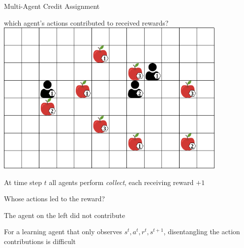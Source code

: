 \begin{frame}{Multi-Agent Credit Assignment}

 which agent's actions contributed to received rewards? \\[15pt]

\bcol
            \centering
            \includegraphics[width=0.85\textwidth]{images/environments/lbf/foraging_8x12_b.png}

        \blist
            \item At time step $t$ all agents perform \textit{collect}, each receiving reward $+1$
            \item Whose actions led to the reward?
            \item The agent on the left did not contribute
            \item For a learning agent that only observes $s^t, a^t, r^t, s^{t+1}$, disentangling the action contributions is difficult
        \elist

\ecol
    
\end{frame}


